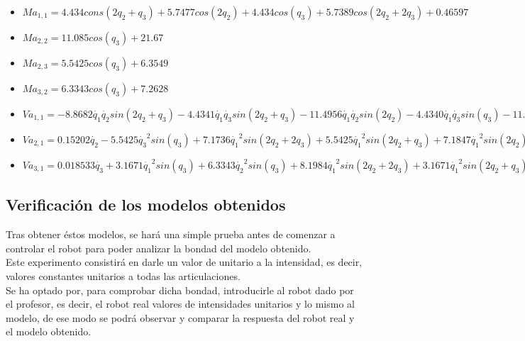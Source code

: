 \begin{itemize}
	\item $ Ma_{1,1}=4.434cons(2q_2 + q_3) + 5.7477cos(2q_2) + 4.434cos(q_3) + 5.7389cos(2q_2 + 2q_3) + 0.46597$ \\ \vspace{0.2cm}
	\item $ Ma_{2,2}= 11.085cos(q_3) + 21.67$ \\ \vspace{0.2cm}
	\item $ Ma_{2,3}=5.5425cos(q_3) + 6.3549$ \\ \vspace{0.2cm}
	\item $ Ma_{3,2}= 6.3343cos(q_3) + 7.2628 $ \\ \vspace{0.2cm}
	\item $ Va_{1,1}= -8.8682\dot{q_{1}}\dot{q_{2}}sin(2q_2 + q_3) - 4.4341\dot{q_{1}}\dot{q_{3}}sin(2q_2 + q_3) - 11.4956\dot{q_{1}}\dot{q_{2}}sin(2q_2)  - 4.4340\dot{q_{1}}\dot{q_{3}}sin(q_3) - 11.4779\dot{q_{1}}\dot{q_{2}}sin(2q_2 + 2q_3) - 11.4779\dot{q_{1}}\dot{q_{3}}sin(2q_2 + 2q_3) + 0.0363 $ \\ \vspace{0.2cm}
	 \item $ Va_{2,1}= 0.15202\dot{q_{2}} - 5.5425\dot{q_{3}}^2sin(q_3) + 7.1736\dot{q_{1}}^2sin(2q_2 + 2q_3) + 5.5425\dot{q_{1}}^2sin(2q_2 + q_3) + 7.1847\dot{q_{1}}^2sin(2q_2) - 11.085\dot{q_{2}}\dot{q_{3}}sin(q_3)$ \\ \vspace{0.2cm}
	 \item $ Va_{3,1}=  0.018533\dot{q_{3}} + 3.1671\dot{q_{1}}^{2}sin(q_3) + 6.3343\dot{q_{2}}^{2}sin(q_3) + 8.1984\dot{q_{1}}^{2}sin(2q_2 + 2q_3) + 3.1671\dot{q_{1}}^{2}sin(2q_2 + q_3)$
\end{itemize}


\newpage
\subsection{Verificación de los modelos obtenidos}
Tras obtener éstos modelos, se hará una simple prueba antes de comenzar a controlar el robot para poder analizar la bondad del modelo obtenido.\\
Este experimento consistirá en darle un valor de unitario a la intensidad, es decir, valores constantes unitarios a todas las articulaciones. \\
Se ha optado por, para comprobar dicha bondad, introducirle al robot dado por el profesor, es decir, el robot real valores de intensidades unitarios y lo mismo al modelo, de ese modo se podrá observar y comparar la respuesta del robot real y el modelo obtenido.\\

